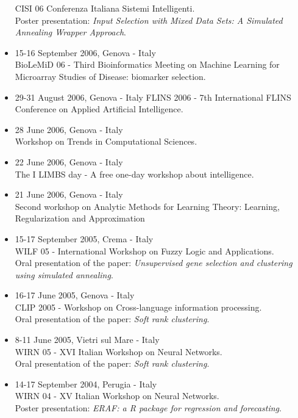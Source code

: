 \documentclass[a4paper,10pt]{article}
\begin{document}
\begin{itemize}
  CISI 06 Conferenza Italiana Sistemi Intelligenti.
  \\Poster presentation: \emph{Input Selection with Mixed Data Sets: A Simulated Annealing Wrapper Approach}.
\item 15-16 September 2006, Genova - Italy \\
  BioLeMiD 06 - Third Bioinformatics Meeting on Machine Learning for Microarray Studies of Disease: biomarker selection.
\item 29-31 August 2006, Genova - Italy
  FLINS 2006 - 7th International FLINS Conference on Applied Artificial Intelligence.
\item 28 June 2006, Genova - Italy \\
  Workshop on Trends in Computational Sciences.
\item 22 June 2006, Genova - Italy \\
  The I LIMBS day - A free one-day workshop about intelligence.
\item 21 June 2006, Genova - Italy \\
  Second workshop on Analytic Methods for Learning Theory: Learning, Regularization and Approximation
\item 15-17 September 2005, Crema - Italy \\
  WILF 05 - International Workshop on Fuzzy Logic and Applications.
  \\Oral presentation of the paper: \emph{Unsupervised gene selection and clustering using simulated annealing}.
\item 16-17 June 2005, Genova - Italy \\
  CLIP 2005 - Workshop on Cross-language information processing.
  \\Oral presentation of the paper: \emph{Soft rank clustering}.
\item 8-11 June 2005, Vietri sul Mare - Italy \\
  WIRN 05 - XVI Italian Workshop on Neural Networks.
  \\Oral presentation of the paper: \emph{Soft rank clustering}.
\item 14-17 September 2004, Perugia - Italy \\
  WIRN 04 - XV Italian Workshop on Neural Networks.
  \\Poster presentation: \emph{ERAF: a R package for regression and forecasting}.
\end{itemize}
\end{document}
